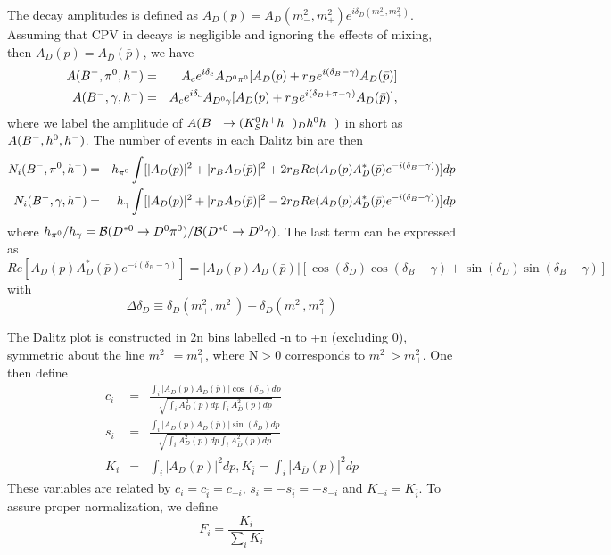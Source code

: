 The \D decay amplitudes is defined as $A_D(p) = A_D(m_-^2,m_+^2)e^{i\delta_D(m_-^2, m_+^2)}$.
Assuming that CPV in \D decays is negligible and ignoring the effects of \D mixing, then $A_D(p) = A_{\bar{D}}(\bar{p})$,
we have 
 \begin{eqnarray}
 A({{{B}^-}}, \pi^0, h^-)  &=& A_c e^{i\delta_c } A_{D^0 \pi^0}[ A_D(p) + r_B e^{i (\delta_B -\gamma)} A_D(\bar{p}) ]  \\ 
A({{{B}^-}}, \gamma, h^-)  &=& A_c e^{i\delta_c } A_{D^0 \gamma} [A_D(p) + r_B e^{i (\delta_B +\pi -\gamma)} A_D(\bar{p})],
 \end{eqnarray} 
where we label the amplitude of $A({{{B}^-}} \rightarrow (K_S^0 h^+ h^-)_D h^0 h^-)$ in short as $A({{{B}^-}}, h^0, h^-)$.
The number of events in each Dalitz bin are then
 \begin{eqnarray}
 N_i({{{B}^-}}, \pi^0, h^-)  &=&  h_{\pi^0}\int  [ |A_D(p)|^2 + |r_B A_D(\bar{p})|^2  + 2r_B Re(A_D(p)A_D^*(\bar{p})e^{-i(\delta_B - \gamma)}) ] dp \\ 
N_i({{{B}^-}}, \gamma, h^-)  &=&h_{\gamma}\int  [|A_D(p)|^2 + |r_B A_D(\bar{p})|^2 - 2r_B Re(A_D(p)A_D^*(\bar{p})e^{-i(\delta_B - \gamma)}) ] dp
 \end{eqnarray} 
 where $h_{\pi^0}/h_{\gamma} = {\mathcal{B}}(D^{*0} \rightarrow D^0 \pi^0)/{\mathcal{B}}(D^{*0} \rightarrow D^0 \gamma)$.
The last term can be expressed as
\begin{equation}
Re[A_D(p)A_D^*(\bar{p})e^{-i(\delta_B - \gamma)}] = |A_D(p)A_D(\bar{p})| [\cos(\delta_D)\cos(\delta_B -\gamma) + \sin(\delta_D)\sin(\delta_B -\gamma) ]
\end{equation}
with
  \begin{equation}
      \Delta\delta_D \equiv \delta_D(m_+^2,m_-^2) - \delta_D(m_-^2,m_+^2)
    \end{equation}

The Dalitz plot is constructed in 2n bins labelled -n to +n (excluding 0), symmetric about the line $m_-^2\ =  m_+^2$, where N$>0$ corresponds to $m_-^2 > m_+^2$.
One then define 
\begin{eqnarray}
c_i &=& \frac{\int_i |A_D(p)A_D(\bar{p})|\cos(\delta_D)dp}{\sqrt{\int_i A^2_D(p)dp \int_i A^2_{\bar{D}}(p)dp}}\\
s_i  &=&  \frac{\int_i |A_D(p)A_D(\bar{p})|\sin(\delta_D)dp}{\sqrt{\int_i A^2_D(p)dp \int_i A^2_{\bar{D}}(p)dp}}\\
K_i &=& \int _i |A_D(p)|^2 dp, K_{\bar{i}} = \int _i |A_{\bar{D}}(p)|^2 dp
\end{eqnarray}
These variables are related by $c_i = c_{\bar{i}} = c_{-i}$, $s_i = -s_{\bar{i}} = -s_{-i}$ and $K_{-i} = K_{\bar{i}}$.
To assure proper normalization, we define 
\begin{equation}
F_i = \frac{K_i}{\sum_i K_i}
\end{equation}


